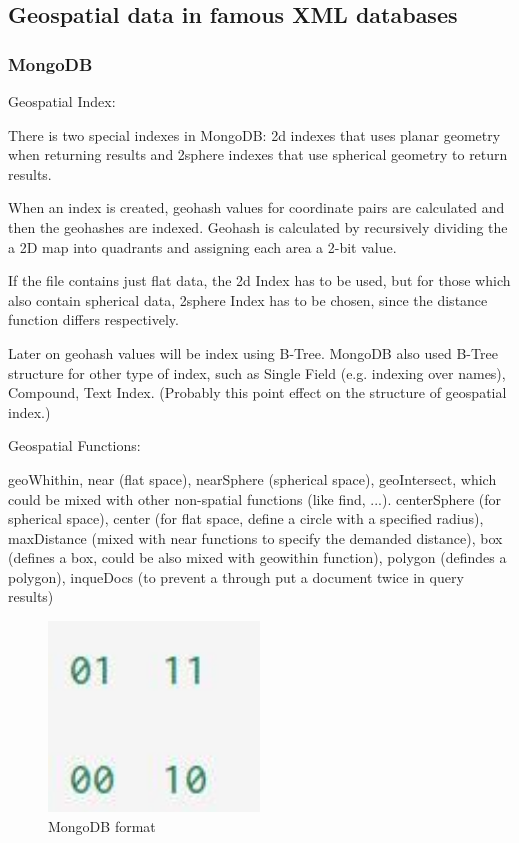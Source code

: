 \documentclass[a4paper,12pt]{article}
\begin{document}
\subsection{Geospatial data in famous XML databases}
\label{s.dbs}
\subsubsection{MongoDB}
\cite{mongogeneral2010}
\cite{mongoinaction2011}

Geospatial Index:

There is two special indexes in MongoDB: 2d indexes that uses planar geometry when returning results and 2sphere indexes that use spherical geometry to return results.

When an index is created, geohash values for coordinate pairs are calculated and then the geohashes are indexed.
Geohash is calculated by recursively dividing the a 2D map into quadrants and assigning each area a 2-bit value.


If the file contains just flat data, the 2d Index has to be used, but for those which also contain spherical data, 2sphere Index has to be chosen, since the distance function differs respectively.

Later on geohash values will be index using B-Tree. 
MongoDB also used B-Tree structure for other type of index, such as Single Field (e.g. indexing over names), Compound, Text Index. (Probably this point effect on the structure of geospatial index.)

Geospatial Functions:

geoWhithin, near (flat space), nearSphere (spherical space), geoIntersect, which could be mixed with other non-spatial functions (like find, ...). 
centerSphere (for spherical space), center (for flat space, define a circle with a specified radius), maxDistance (mixed with near functions to specify the demanded distance), box (defines a box, could be also mixed with geowithin function), polygon (defindes a polygon), inqueDocs (to prevent a through put a document twice in query results)

\begin{figure}
\centering
\includegraphics[width=0.5\textwidth]{mongoformat}
\caption{MongoDB format}
\label{fig1}
\end{figure}
\end{document}
